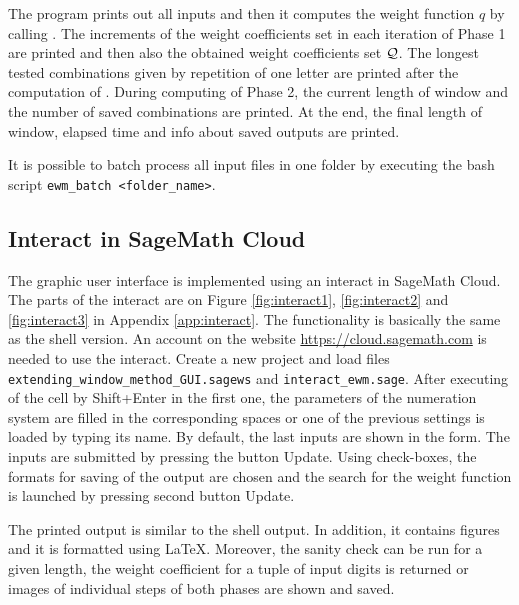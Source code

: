 The program prints out all inputs and then it computes the weight function $q$ by calling . The increments of the weight coefficients set in each iteration of Phase 1 are printed and then also the obtained weight coefficients set $\mathcal{Q}$. The longest tested combinations given by repetition of one letter are printed after the computation of . During computing of Phase 2, the current length of window and the number of saved combinations are printed. At the end, the final length of window, elapsed time and info about saved outputs are printed.  

It is possible to batch process all input files in one folder by executing the bash script \verb+ewm_batch <folder_name>+.  

\subsection{Interact in SageMath Cloud}
The graphic user interface is implemented using an interact in SageMath Cloud. The parts of the interact are on Figure \ref{fig:interact1}, \ref{fig:interact2} and \ref{fig:interact3} in Appendix \ref{app:interact}. The functionality is basically the same as the shell version. An account on the website \url{https://cloud.sagemath.com} is needed to use the interact. Create a new project and load files \verb+extending_window_method_GUI.sagews+ and \verb+interact_ewm.sage+. After executing of the cell by Shift+Enter in the first one, the parameters of the numeration system are filled in the corresponding spaces or one of the previous settings is loaded by typing its name.  By default, the last inputs are shown in the form. The inputs are submitted by pressing the button Update. Using check-boxes, the formats for saving of the output are chosen and the search for the weight function is launched by pressing second button Update.

The printed output is similar to the shell output. In addition, it contains figures and it is formatted using \LaTeX. Moreover, the sanity check can be run for a given length, the weight coefficient for a tuple of  input digits is returned or images of individual steps of both phases are shown and saved.